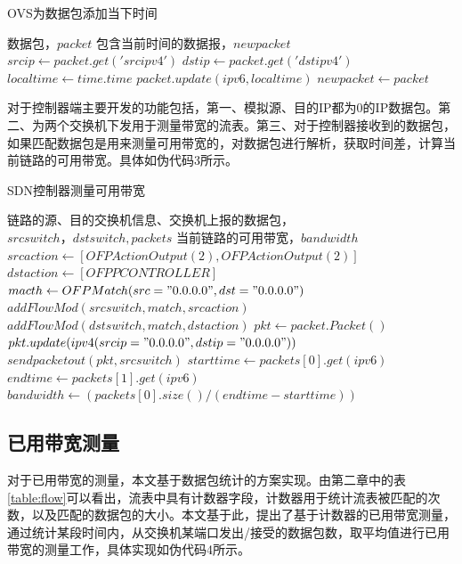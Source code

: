 \begin{algorithm}[!htb]
    \caption{OVS为数据包添加当下时间}
    \begin{algorithmic}[1] %
        \Require 数据包，$packet$
        \Ensure 包含当前时间的数据报，$newpacket$
        	\State $srcip \gets packet.get('srcipv4')$
        	\State $dstip \gets packet.get('dstipv4')$
        		\State $localtime \gets time.time$
        		\State $packet.update(ipv6, localtime)$
        	\EndIf
      		\State $newpacket \gets packet$
      		\State {}
        \EndFunction
    \end{algorithmic}
\end{algorithm}

对于控制器端主要开发的功能包括，第一、模拟源、目的IP都为0的IP数据包。第二、为两个交换机下发用于测量带宽的流表。第三、对于控制器接收到的数据包，如果匹配数据包是用来测量可用带宽的，对数据包进行解析，获取时间差，计算当前链路的可用带宽。具体如伪代码3所示。

\begin{algorithm}[!htb]
    \caption{SDN控制器测量可用带宽}
    \begin{algorithmic}[1] %
        \Require 链路的源、目的交换机信息、交换机上报的数据包，$srcswitch，dstswitch,packets$
        \Ensure 当前链路的可用带宽，$bandwidth$
        	\State $srcaction \gets [OFPActionOutput(2),OFPActionOutput(2)]$
        	\State $dstaction \gets [OFPPCONTROLLER]$
        	\State $macth \gets OFPMatch(src="0.0.0.0",dst="0.0.0.0")$
        	\State $addFlowMod(srcswitch,match,srcaction)$
        	\State $addFlowMod(dstswitch,match,dstaction)$
        \EndFunction
        	\State $pkt \gets packet.Packet()$
        	\State $pkt.update(ipv4(srcip="0.0.0.0",dstip="0.0.0.0"))$
        	\State $sendpacketout(pkt, srcswitch)$
        \EndFunction
         	\State $starttime \gets packets[0].get(ipv6)$
         	\State $endtime \gets packets[1].get(ipv6)$
         	\State $bandwidth \gets (packets[0].size()/(endtime-starttime))$
         	\State {}
        \EndFunction
    \end{algorithmic}
\end{algorithm}
\subsection{已用带宽测量}
对于已用带宽的测量，本文基于数据包统计的方案实现。由第二章中的表\ref{table:flow}可以看出，流表中具有计数器字段，计数器用于统计流表被匹配的次数，以及匹配的数据包的大小。本文基于此，提出了基于计数器的已用带宽测量，通过统计某段时间内，从交换机某端口发出/接受的数据包数，取平均值进行已用带宽的测量工作，具体实现如伪代码4所示。

